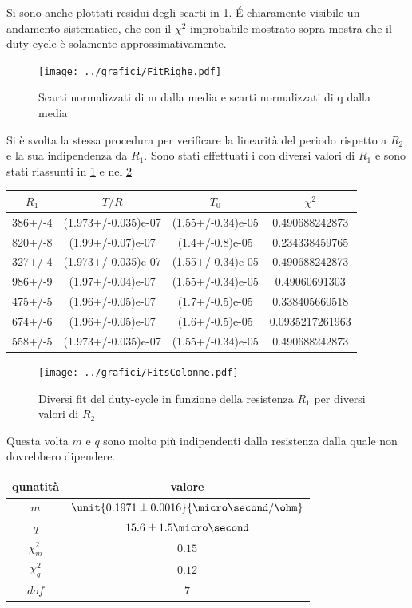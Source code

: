 \documentclass[a4paper,10pt]{article}
\begin{document}
Si sono anche plottati residui degli scarti in \cref{fig:FitRighe}. \'E chiaramente visibile un andamento sistematico, che con il $\chi^2$ improbabile mostrato sopra mostra che il duty-cycle è solamente approssimativamente.


\begin{figure}[H]
	\centering
	\texttt{[image: ../grafici/FitRighe.pdf]}
	\caption{Scarti normalizzati di m dalla media e scarti normalizzati di q dalla media}
	\label{fig:FitRighe}
\end{figure}



Si è svolta la stessa procedura per verificare la linearità del periodo rispetto a $R_2$ e la sua indipendenza da $R_1$. Sono stati effettuati i con diversi valori di $R_1$ e sono stati riassunti in \cref{tab:FitsColonne} e nel \cref{fig:FitsColonne} 

\begin{table}[H]
\centering
\begin{tabular}{c|c|c|c} 
$R_1$ & $T/R$ & $T_0$ & $\chi^2$\\
\hline
386+/-4 & (1.973+/-0.035)e-07 & (1.55+/-0.34)e-05 & 0.490688242873\\
820+/-8 & (1.99+/-0.07)e-07 & (1.4+/-0.8)e-05 & 0.234338459765\\
327+/-4 & (1.973+/-0.035)e-07 & (1.55+/-0.34)e-05 & 0.490688242873\\
986+/-9 & (1.97+/-0.04)e-07 & (1.55+/-0.34)e-05 & 0.49060691303\\
475+/-5 & (1.96+/-0.05)e-07 & (1.7+/-0.5)e-05 & 0.338405660518\\
674+/-6 & (1.96+/-0.05)e-07 & (1.6+/-0.5)e-05 & 0.0935217261963\\
558+/-5 & (1.973+/-0.035)e-07 & (1.55+/-0.34)e-05 & 0.490688242873\\
\end{tabular}
\label{tab:FitsColonne}
\end{table}

\begin{figure}[H]
	\centering
	\texttt{[image: ../grafici/FitsColonne.pdf]}
	\caption{Diversi fit del duty-cycle in funzione della resistenza $R_1$ per diversi valori di $R_2$}
	\label{fig:FitsColonne}
\end{figure}


Questa volta $m$ e $q$ sono molto più indipendenti dalla resistenza dalla quale non dovrebbero dipendere.

\begin{table}[H]
\centering
\begin{tabular}{c|c} 
qunatità & valore\\
\hline
$m$ & $\unit{0.1971 \pm 0.0016}{\micro\second/\ohm} $\\
$q$ & ${15.6 \pm 1.5}{\micro\second}$\\
$\chi^2_m$ & $0.15$\\
$\chi^2_q$ & $0.12$\\
$dof$ & $7$\\
\end{tabular}
\end{table}
\end{document}

